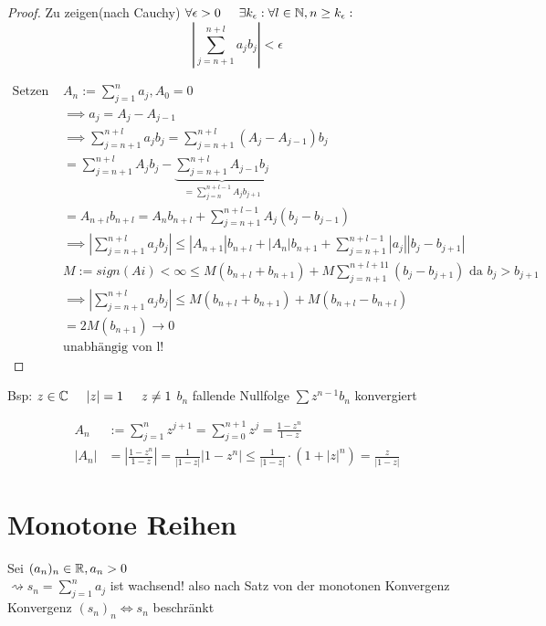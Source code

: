 \begin{proof}
 Zu zeigen(nach Cauchy) $\forall \epsilon > 0 \hspace{5mm} \exists k_\epsilon: \forall l \in \mathbb{N}, n \ge k_\epsilon:$
 $$| \sum_{j=n+1}^{n+l} a_j b_j | < \epsilon$$
 
 \begin{equation}
  \begin{split}
    \text{Setzen } & A_n := \sum_{j=1}^{n}a_j, A_0 = 0 \\
    & \implies a_j = A_j - A_{j-1} \\
    & \implies \sum_{j=n+1}^{n+l}  a_j b_j = \sum_{j=n+1}^{n+l} (A_j - A_{j-1}) b_j \\
    & = \sum_{j=n+1}^{n+l}  A_j b_j - \underbrace{\sum_{j=n+1}^{n+l}  A_{j-1} b_j}_{= \sum_{j=n}^{n+l-1} A_j b_{j+1}} \\
    & = A_{n+l} b_{n+l} = A_n b_{n+l} + \sum_{j=n+1}^{n+l-1} A_j (b_j - b_{j-1}) \\
    & \implies | \sum_{j=n+1}^{n+l}  a_j b_j | \le | A_{n+1} | b_{n+l} + |A_n| b_{n+1} + \sum_{j=n+1}^{n+l-1} |a_j| |b_j - b_{j+1}|  \\
    & M := sign(Ai) < \infty \le M (b_{n+l} + b_{n+1}) + M \sum_{j=n+1}^{n+l+11} (b_j - b_{j+1})  \text{  da  } b_j > b_{j+1} \\
    & \implies |\sum_{j=n+1}^{n+l} a_j b_j| \le M(b_{n+l} + b_{n+1}) + M (b_{n+l} - b_{n+l}) \\
    & = 2 M(b_{n+1}) \to 0 \\
    & \text{unabhängig von l!}
  \end{split}
 \end{equation}
\end{proof}

Bsp: $z \in \mathbb{C} \hspace{5mm}  |z| = 1 \hspace{5mm} z \neq 1$
$b_n $ fallende Nullfolge
$\sum z^{n-1} b_n$ konvergiert

\begin{equation}
 \begin{split}
  A_n & := \sum_{j=1}^{n} z^{j+1} = \sum_{j=0}^{n+1}z^j = \frac{1-z^n}{1-z} \\
  |A_n| & = |\frac{1-z^n}{1-z}| = \frac{1}{|1-z|} | 1-z^n| \leq \frac{1}{|1-z|}
  \cdot (1+|z|^n) = \frac{z}{|1-z|}
 \end{split}
\end{equation}

\section{Monotone Reihen}
Sei $(a_n)_n \in \mathbb{R}, a_n > 0$ \\
$\rightsquigarrow s_n = \sum_{j=1}^n a_j$ ist wachsend!
also nach Satz von der monotonen Konvergenz
Konvergenz $(s_n)_n \Leftrightarrow s_n$ beschränkt

